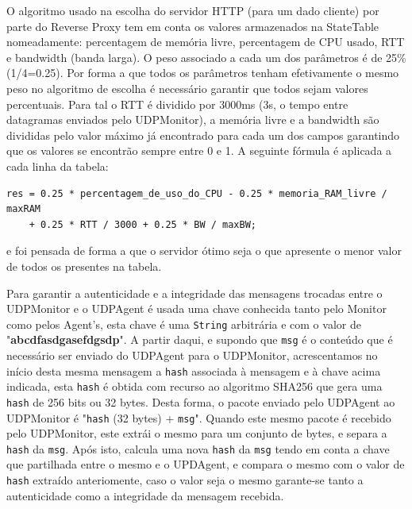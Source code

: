 \documentclass{article}
\begin{document}
O algoritmo usado na escolha do servidor HTTP (para um dado cliente) por parte do Reverse Proxy tem em conta os valores armazenados na StateTable nomeadamente: percentagem de memória livre, percentagem de CPU usado, RTT e bandwidth (banda larga). O peso associado a cada um dos parâmetros é de 25\% (1/4=0.25). Por forma a que todos os parâmetros tenham efetivamente o mesmo peso no algoritmo de escolha é necessário garantir que todos sejam valores percentuais. Para tal o RTT é dividido por 3000ms (3s, o tempo entre datagramas enviados pelo UDPMonitor), a memória livre e a bandwidth são divididas pelo valor máximo já encontrado para cada um dos campos garantindo que os valores se encontrão sempre entre 0 e 1. A seguinte fórmula é aplicada a cada linha da tabela:
\begin{verbatim}
res = 0.25 * percentagem_de_uso_do_CPU - 0.25 * memoria_RAM_livre / maxRAM 
	+ 0.25 * RTT / 3000 + 0.25 * BW / maxBW;
\end{verbatim}
e foi pensada de forma a que o servidor ótimo seja o que apresente o menor valor de todos os presentes na tabela.

Para garantir a autenticidade e a integridade das mensagens trocadas entre o UDPMonitor e o UDPAgent é usada uma chave conhecida tanto pelo Monitor como pelos Agent's, esta chave é uma \texttt{String} arbitrária e com o valor de "\textbf{abcdfasdgasefdgsdp}". A partir daqui, e supondo que \texttt{msg} é o conteúdo que é necessário ser enviado do UDPAgent para o UDPMonitor, acrescentamos no início desta mesma mensagem a \texttt{hash} associada à mensagem e à chave acima indicada, esta \texttt{hash} é obtida com recurso ao algoritmo SHA256 que gera uma \texttt{hash} de 256 bits ou 32 bytes. Desta forma, o pacote enviado pelo UDPAgent ao UDPMonitor é "\texttt{hash} (32 bytes) + \texttt{msg}". Quando este mesmo pacote é recebido pelo UDPMonitor, este extrái o mesmo para um conjunto de bytes, e separa a \texttt{hash} da \texttt{msg}. Após isto, calcula uma nova \texttt{hash} da \texttt{msg} tendo em conta a chave que partilhada entre o mesmo e o UPDAgent, e compara o mesmo com o valor de \texttt{hash} extraído anteriomente, caso o valor seja o mesmo garante-se tanto a autenticidade como a integridade da mensagem recebida.
\end{document}
